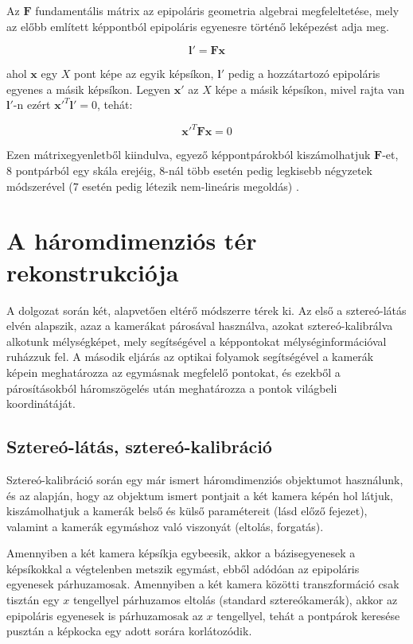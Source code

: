 Az $\mathbf{F}$ fundamentális mátrix az epipoláris geometria algebrai megfeleltetése, mely az előbb említett képpontból epipoláris egyenesre történő leképezést adja meg.

\[\mathbf{l}' = \mathbf{F}\mathbf{x}\]

ahol $\mathbf{x}$ egy $X$ pont képe az egyik képsíkon, $\mathbf{l}'$ pedig a hozzátartozó epipoláris egyenes a másik képsíkon. Legyen $\mathbf{x}'$ az $X$ képe a másik képsíkon, mivel rajta van $\mathbf{l}'$-n ezért $\mathbf{x}'^T \mathbf{l}' = 0$, tehát:

\[\mathbf{x}'^T\mathbf{F}\mathbf{x} = 0\]

Ezen mátrixegyenletből kiindulva, egyező képpontpárokból kiszámolhatjuk $\mathbf{F}$-et, 8 pontpárból egy skála erejéig, 8-nál több esetén pedig legkisebb négyzetek módszerével (7 esetén pedig létezik nem-lineáris megoldás) \cite[10.1 alfejezet]{HZ}.

\section{A háromdimenziós tér rekonstrukciója \label{sec:methods}}


A dolgozat során két, alapvetően eltérő módszerre térek ki. Az első a sztereó-látás elvén alapszik, azaz a kamerákat párosával használva, azokat sztereó-kalibrálva alkotunk mélységképet, mely segítségével a képpontokat mélységinformációval ruházzuk fel. A második eljárás az optikai folyamok segítségével a kamerák képein meghatározza az egymásnak megfelelő pontokat, és ezekből a párosításokból háromszögelés után meghatározza a pontok világbeli koordinátáját.

\subsection{Sztereó-látás, sztereó-kalibráció}

Sztereó-kalibráció \cite{camera-calib-3d} során egy már ismert háromdimenziós objektumot használunk, és az alapján, hogy az objektum ismert pontjait a két kamera képén hol látjuk, kiszámolhatjuk a kamerák belső és külső paramétereit (lásd előző fejezet), valamint a kamerák egymáshoz való viszonyát (eltolás, forgatás). 

Amennyiben a két kamera képsíkja egybeesik, akkor a bázisegyenesek a képsíkokkal a végtelenben metszik egymást, ebből adódóan az epipoláris egyenesek párhuzamosak. Amennyiben a két kamera közötti transzformáció csak tisztán egy $x$ tengellyel párhuzamos eltolás (standard sztereókamerák), akkor az epipoláris egyenesek is párhuzamosak az $x$ tengellyel, tehát a pontpárok keresése pusztán a képkocka egy adott sorára korlátozódik.

